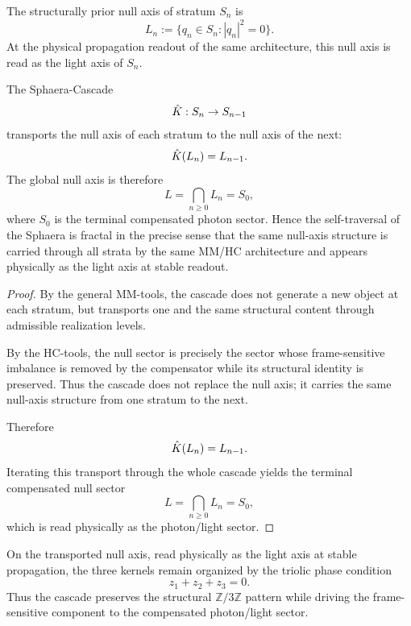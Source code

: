 \begin{definition}
The structurally prior null axis of stratum $S_n$ is
\[
L_n:=\{q_n\in S_n:|q_n|^2=0\}.
\]
At the physical propagation readout of the same architecture, this null
axis is read as the light axis of $S_n$.
\end{definition}

\begin{theorem}\label{thm:fractal}
The Sphaera-Cascade
\[
\hat{K}:S_n\to S_{n-1}
\]
transports the null axis of each stratum to the null axis of the next:
\[
\hat{K}(L_n)=L_{n-1}.
\]
The global null axis is therefore
\[
L=\bigcap_{n\ge 0}L_n=S_0,
\]
where $S_0$ is the terminal compensated photon sector.
Hence the self-traversal of the Sphaera is fractal in the precise sense
that the same null-axis structure is carried through all strata by the
same MM/HC architecture and appears physically as the light axis at
stable readout.
\end{theorem}

\begin{proof}
By the general MM-tools, the cascade does not generate a new object at
each stratum, but transports one and the same structural content through
admissible realization levels.

By the HC-tools, the null sector is precisely the sector whose
frame-sensitive imbalance is removed by the compensator while its
structural identity is preserved.
Thus the cascade does not replace the null axis; it carries the same
null-axis structure from one stratum to the next.

Therefore
\[
\hat{K}(L_n)=L_{n-1}.
\]
Iterating this transport through the whole cascade yields the terminal
compensated null sector
\[
L=\bigcap_{n\ge 0}L_n=S_0,
\]
which is read physically as the photon/light sector.
\end{proof}

\begin{remark}
On the transported null axis, read physically as the light axis at stable propagation, the three kernels remain organized by the
triolic phase condition
\[
z_1+z_2+z_3=0.
\]
Thus the cascade preserves the structural $\mathbb{Z}/3\mathbb{Z}$
pattern while driving the frame-sensitive component to the compensated
photon/light sector.
\end{remark}


